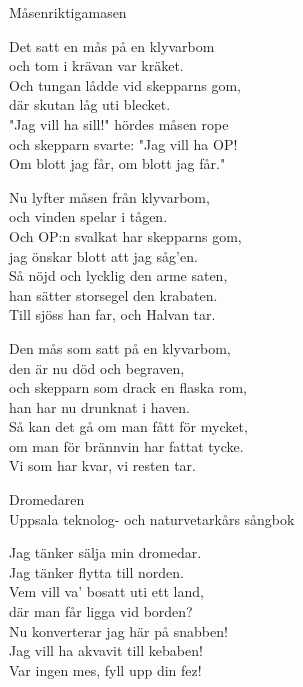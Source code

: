 \begin{song}{Måsen}{riktigamasen}
\begin{vers}
Det satt en mås på en klyvarbom \\
och tom i krävan var kräket. \\
Och tungan lådde vid skepparns gom,\\ 
där skutan låg uti blecket. \\
"Jag vill ha sill!" hördes måsen rope \\
och skepparn svarte: "Jag vill ha OP! \\
Om blott jag får, om blott jag får." \\
\end{vers}
 


  \begin{vers}
Nu lyfter måsen från klyvarbom, \\
och vinden spelar i tågen. \\
Och OP:n svalkat har skepparns gom, \\
jag önskar blott att jag såg'en. \\
Så nöjd och lycklig den arme saten, \\
han sätter storsegel den krabaten. \\
Till sjöss han far, och Halvan tar. \\
\end{vers}
 

  
  \begin{vers}
Den mås som satt på en klyvarbom,\\ 
den är nu död och begraven, \\
och skepparn som drack en flaska rom, \\
han har nu drunknat i haven. \\
Så kan det gå om man fått för mycket, \\
om man för brännvin har fattat tycke. \\
Vi som har kvar, vi resten tar. \\
\end{vers}
 


{\Large Dromedaren}\\{\tiny  Uppsala teknolog- och naturvetarkårs sångbok}
  \begin{vers}
Jag tänker sälja min dromedar.\\ 
Jag tänker flytta till norden. \\
Vem vill va’ bosatt uti ett land, \\
där man får ligga vid borden? \\
Nu konverterar jag här på snabben! \\
Jag vill ha akvavit till kebaben! \\
Var ingen mes, fyll upp din fez! \\
\end{vers}
 


\end{song}
